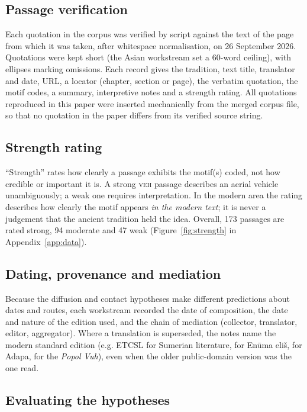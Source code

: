 \documentclass[11pt,a4paper]{article}
\begin{document}
\subsection{Passage verification}

Each quotation in the corpus was verified by script against the text of the page from which it was taken, after whitespace normalisation, on 26 September 2026. Quotations were kept short (the Asian workstream set a 60-word ceiling), with ellipses marking omissions. Each record gives the tradition, text title, translator and date, URL, a locator (chapter, section or page), the verbatim quotation, the motif codes, a summary, interpretive notes and a strength rating. All quotations reproduced in this paper were inserted mechanically from the merged corpus file, so that no quotation in the paper differs from its verified source string.

\subsection{Strength rating}

``Strength'' rates how clearly a passage exhibits the motif(s) coded, not how credible or important it is. A strong \textsc{veh} passage describes an aerial vehicle unambiguously; a weak one requires interpretation. In the modern area the rating describes how clearly the motif appears \emph{in the modern text}; it is never a judgement that the ancient tradition held the idea. Overall, 173 passages are rated strong, 94 moderate and 47 weak (Figure~\ref{fig:strength} in Appendix~\ref{app:data}).

\subsection{Dating, provenance and mediation}

Because the diffusion and contact hypotheses make different predictions about dates and routes, each workstream recorded the date of composition, the date and nature of the edition used, and the chain of mediation (collector, translator, editor, aggregator). Where a translation is superseded, the notes name the modern standard edition (e.g. ETCSL for Sumerian literature, \textcite{lambert2013creation} for Enūma eliš, \textcite{izreel2001adapa} for Adapa, \textcite{tedlock1996popol} for the \emph{Popol Vuh}), even when the older public-domain version was the one read.

\subsection{Evaluating the hypotheses}
\end{document}
